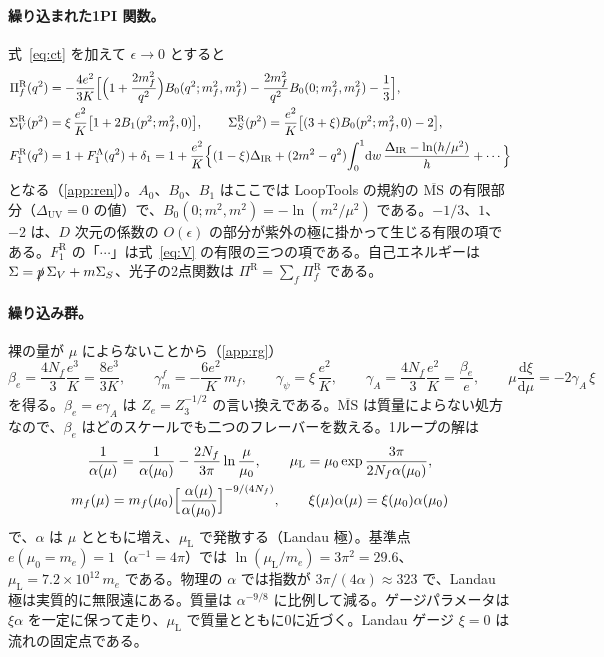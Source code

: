 \documentclass[a4paper,10pt]{ltjsarticle}
\newcommand{\dd}{\mathrm{d}}
\newcommand{\MSbar}{\overline{\mathrm{MS}}}
\newcommand{\DUV}{\Delta_{\mathrm{UV}}}
\newcommand{\DIR}{\Delta_{\mathrm{IR}}}
\begin{document}
\paragraph{繰り込まれた1PI 関数。}式~\eqref{eq:ct} を加えて $\epsilon\to0$ とすると
\begin{equation}
\begin{aligned}
\Pi_f^{\mathrm R}(q^2)&=-\frac{4e^2}{3K}\Bigl[\Bigl(1+\frac{2m_f^2}{q^2}\Bigr)B_0(q^2;m_f^2,m_f^2)-\frac{2m_f^2}{q^2}B_0(0;m_f^2,m_f^2)-\frac13\Bigr],\\
\Sigma_V^{\mathrm R}(p^2)&=\xi\,\frac{e^2}{K}\bigl[1+2B_1(p^2;m_f^2,0)\bigr],\qquad
\Sigma_S^{\mathrm R}(p^2)=\frac{e^2}{K}\bigl[(3+\xi)B_0(p^2;m_f^2,0)-2\bigr],\\
F_1^{\mathrm R}(q^2)&=1+F_1^\Lambda(q^2)+\delta_1=1+\frac{e^2}{K}\Bigl\{(1-\xi)\DIR+(2m^2-q^2)\!\int_0^1\!\dd w\,\frac{\DIR-\ln(h/\mu^2)}{h}+\cdots\Bigr\}
\end{aligned}
\label{eq:VR}
\end{equation}
となる（\ref{app:ren}）。$A_0$、$B_0$、$B_1$ はここでは LoopTools の規約の $\MSbar$ の有限部分（$\DUV=0$ の値）で、$B_0(0;m^2,m^2)=-\ln(m^2/\mu^2)$ である。$-1/3$、$1$、$-2$ は、$D$ 次元の係数の $O(\epsilon)$ の部分が紫外の極に掛かって生じる有限の項である。$F_1^{\mathrm R}$ の「$\cdots$」は式~\eqref{eq:V} の有限の三つの項である。自己エネルギーは $\Sigma=\slashed p\,\Sigma_V+m\Sigma_S$、光子の2点関数は $\Pi^{\mathrm R}=\sum_f\Pi_f^{\mathrm R}$ である。

\paragraph{繰り込み群。}裸の量が $\mu$ によらないことから（\ref{app:rg}）
\begin{equation}
\beta_e=\frac{4N_f}{3}\frac{e^3}{K}=\frac{8e^3}{3K},\qquad
\gamma_m^f=-\frac{6e^2}{K}\,m_f,\qquad
\gamma_\psi=\xi\,\frac{e^2}{K},\qquad
\gamma_A=\frac{4N_f}{3}\frac{e^2}{K}=\frac{\beta_e}{e},\qquad
\mu\frac{\dd\xi}{\dd\mu}=-2\gamma_A\,\xi
\label{eq:rge}
\end{equation}
を得る。$\beta_e=e\gamma_A$ は $Z_e=Z_3^{-1/2}$ の言い換えである。$\MSbar$ は質量によらない処方なので、$\beta_e$ はどのスケールでも二つのフレーバーを数える。1ループの解は
\begin{equation}
\begin{gathered}
\frac{1}{\alpha(\mu)}=\frac{1}{\alpha(\mu_0)}-\frac{2N_f}{3\pi}\ln\frac{\mu}{\mu_0},\qquad
\mu_{\mathrm L}=\mu_0\exp\frac{3\pi}{2N_f\alpha(\mu_0)},\\
m_f(\mu)=m_f(\mu_0)\Bigl[\frac{\alpha(\mu)}{\alpha(\mu_0)}\Bigr]^{-9/(4N_f)},\qquad
\xi(\mu)\alpha(\mu)=\xi(\mu_0)\alpha(\mu_0)
\end{gathered}
\label{eq:run}
\end{equation}
で、$\alpha$ は $\mu$ とともに増え、$\mu_{\mathrm L}$ で発散する（Landau 極）。基準点 $e(\mu_0=m_e)=1$（$\alpha^{-1}=4\pi$）では $\ln(\mu_{\mathrm L}/m_e)=3\pi^2=29.6$、$\mu_{\mathrm L}=7.2\times10^{12}\,m_e$ である。物理の $\alpha$ では指数が $3\pi/(4\alpha)\approx323$ で、Landau 極は実質的に無限遠にある。質量は $\alpha^{-9/8}$ に比例して減る。ゲージパラメータは $\xi\alpha$ を一定に保って走り、$\mu_{\mathrm L}$ で質量とともに0に近づく。Landau ゲージ $\xi=0$ は流れの固定点である。
\end{document}
